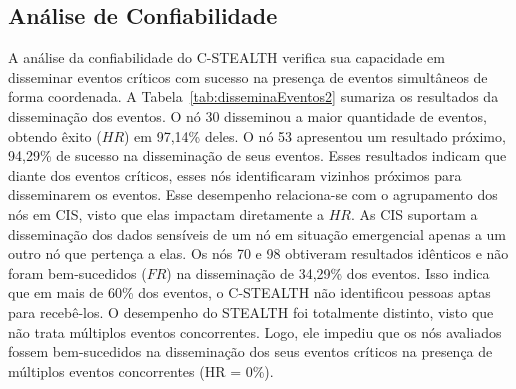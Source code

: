 \documentclass[12pt]{article}
\begin{document}
\subsection{Análise de Confiabilidade}

A análise da confiabilidade do \mbox{C-STEALTH} verifica sua capacidade em disseminar eventos críticos com sucesso na presença de eventos simultâneos de forma coordenada.
A Tabela~\ref{tab:disseminaEventos2} sumariza os resultados da disseminação dos eventos.
O nó 30 disseminou a maior quantidade de eventos, obtendo êxito ($HR$) em 97,14\% deles. O nó 53 apresentou um resultado próximo, 94,29\% de sucesso na disseminação de seus eventos. Esses resultados indicam que 
diante
dos
eventos críticos, esses nós identificaram vizinhos próximos para disseminarem os eventos. Esse desempenho relaciona-se com o agrupamento dos nós em CIS, visto que elas impactam diretamente a $HR$. As CIS suportam a disseminação dos dados sensíveis de um nó em situação emergencial apenas a um outro nó que pertença a elas. Os nós 70 e 98 obtiveram resultados idênticos e não foram bem-sucedidos ($FR$) na disseminação de 34,29\% dos eventos. Isso indica que em mais de 60\% dos eventos, o \mbox{C-STEALTH} não identificou pessoas aptas para recebê-los. O desempenho do STEALTH foi totalmente distinto, visto que não trata múltiplos eventos concorrentes. Logo, ele impediu que os nós avaliados fossem bem-sucedidos na disseminação dos seus eventos críticos na presença de múltiplos eventos concorrentes (HR = 0\%). 




\begin{comment}
\begin{table}[ht]
\relsize{-1.0}
\centering
\caption{Disseminação dos eventos}
\label{tab:disseminaEventos}
\begin{tabular}{l|c|cc|cc|cc}
\hlineB{2}
\multicolumn{2}{l|}{\textbf{Nós}}      & \textbf{30} & \textbf{53} & \textbf{70} & \textbf{92} & \textbf{95} & \textbf{98} \\ \hline
\multirow{3}{*}{\textbf{Métricas}} & \textbf{HR} &  97,14\%  &  94,29\%  &  65,71\%  &  71,43\%  &  74,29\%  &  65,71\%  \\ %
                          & \textbf{FR} &  12,86\%  &  15,71\%  &  34,29\%  &  28,57\%  &  25,71\%  &  34,29\%  \\ %
                          & \textbf{ADE} &  166ms  &  93ms  &  82ms  &  56ms  &  54ms  &  88ms  \\ \hlineB{2}                          
\end{tabular}
\end{table}

\begin{wrapfigure}{r}{0.45\textwidth}
\centering
\texttt{[image: figures/tries\_evolution.png]}
\vspace{-0.3cm}
\caption[Número de disseminações]
{\tabular[t]{@{}l@{}} Número de \\ disseminações \endtabular}
\label{fig:tentativasD}
\end{wrapfigure}
\end{comment}
\end{document}
